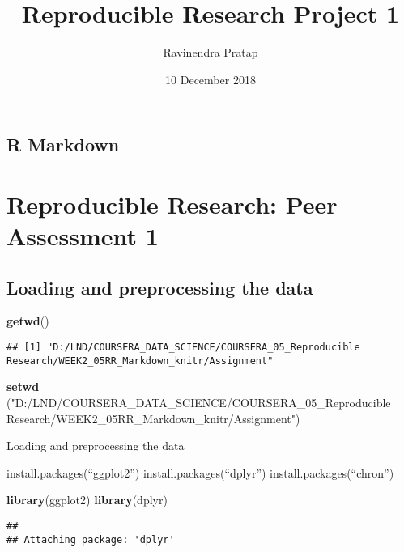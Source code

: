 \documentclass[]{article}
\title{Reproducible Research Project 1}
\author{Ravinendra Pratap}
\date{10 December 2018}
\newenvironment{Shaded}{\begin{snugshade}}{\end{snugshade}}
\newcommand{\KeywordTok}[1]{\textcolor[rgb]{0.13,0.29,0.53}{\textbf{#1}}}
\newcommand{\StringTok}[1]{\textcolor[rgb]{0.31,0.60,0.02}{#1}}
\newcommand{\NormalTok}[1]{#1}
\begin{document}
\maketitle

\subsection{R Markdown}\label{r-markdown}

\section{Reproducible Research: Peer Assessment
1}\label{reproducible-research-peer-assessment-1}

\subsection{Loading and preprocessing the
data}\label{loading-and-preprocessing-the-data}

\begin{Shaded}
\begin{Highlighting}[]
\KeywordTok{getwd}\NormalTok{()}
\end{Highlighting}
\end{Shaded}

\begin{verbatim}
## [1] "D:/LND/COURSERA_DATA_SCIENCE/COURSERA_05_Reproducible Research/WEEK2_05RR_Markdown_knitr/Assignment"
\end{verbatim}

\begin{Shaded}
\begin{Highlighting}[]
\KeywordTok{setwd}\NormalTok{ (}\StringTok{"D:/LND/COURSERA_DATA_SCIENCE/COURSERA_05_Reproducible Research/WEEK2_05RR_Markdown_knitr/Assignment"}\NormalTok{)}
\end{Highlighting}
\end{Shaded}

Loading and preprocessing the data

install.packages(``ggplot2'') install.packages(``dplyr'')
install.packages(``chron'')

\begin{Shaded}
\begin{Highlighting}[]
\KeywordTok{library}\NormalTok{(ggplot2)}
\KeywordTok{library}\NormalTok{(dplyr)}
\end{Highlighting}
\end{Shaded}

\begin{verbatim}
## 
## Attaching package: 'dplyr'
\end{verbatim}
\end{document}
